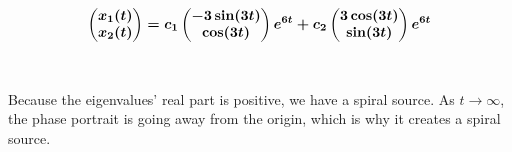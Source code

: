 \documentclass[12pt]{article}
\begin{document}
\\ 
$$
\boldmath
\begin{pmatrix}
x_1(t) \\
x_2(t)
\end{pmatrix} = 
c_1
\begin{pmatrix}
-3\sin(3t) \\
\cos(3t)
\end{pmatrix}e^{6t} + 
c_2
\begin{pmatrix}
3\cos(3t) \\
\sin(3t)
\end{pmatrix}e^{6t}
$$
\\ \\
Because the eigenvalues' real part is positive, we have a spiral source.  As $t \rightarrow \infty$, the phase portrait is going away from the origin, which is why it creates a spiral source. 
\end{document}
